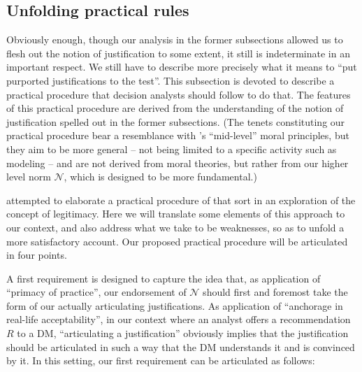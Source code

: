 \documentclass[preprint, french, english, 11pt, authoryear]{elsarticle}%
\newcommand{\adv}{\mathscr{N}}
\begin{document}
\subsection{Unfolding practical rules}
Obviously enough, though our analysis in the former subsections allowed us to flesh out the notion of justification to some extent, it still is indeterminate in an important respect. We still have to describe more precisely what it means to ``put purported justifications to the test''. This subsection is devoted to describe a practical procedure that decision analysts should follow to do that. The features of this practical procedure are derived from the understanding of the notion of justification spelled out in the former subsections. (The tenets constituting our practical procedure bear a resemblance with \citeauthor{diekmann_moral_2013}’s \citeyearpar{diekmann_moral_2013} ``mid-level'' moral principles, but they aim to be more general -- not being limited to a specific activity such as modeling -- and are not derived from moral theories, but rather from our higher level norm $\mathscr{N}$, which is designed to be more fundamental.)

\citet{meinard_what_2017} attempted to elaborate a practical procedure of that sort in an exploration of the concept of legitimacy. Here we will translate some elements of this approach to our context, and also address what we take to be weaknesses, so as to unfold a more satisfactory account. Our proposed practical procedure will be articulated in four points.

A first requirement is designed to capture the idea that, as application of “primacy of practice”, our endorsement of $\adv$ should first and foremost take the form of our actually articulating justifications. As application of ``anchorage in real-life acceptability'', in our context where an analyst offers a recommendation $R$ to a \ac{DM}, ``articulating a justification'' obviously implies that the justification should be articulated in such a way that the \ac{DM} understands it and is convinced by it. In this setting, our first requirement can be articulated as follows:
\end{document}
